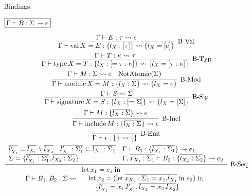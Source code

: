 Bindings:

$\fbox{$\Gamma \vdash B: \Sigma \rightsquigarrow e$}$

\begin{gather*}
  \infer[\text{B-Val}]{\Gamma \vdash \symval X = E: \{l_X: [\tau]\} \elaborate \{l_X = [e]\}}{
    \Gamma \vdash E: \tau \elaborate e
  }
  \\
  \infer[\text{B-Typ}]{\Gamma \vdash \symtype X = T: \{l_X: [= \tau: \kappa]\} \elaborate \{l_X = [\tau: \kappa]\}}{
    \Gamma \vdash T: \kappa \elaborate \tau
  }
  \\
  \infer[\text{B-Mod}]{\Gamma \vdash \symmodule X = M: \{l_X: \Sigma\} \elaborate \{l_X = e\}}{
    \Gamma \vdash M: \Sigma \elaborate e
    &
    \symNotAtomic(\Sigma)
  }
  \\
  \infer[\text{B-Sig}]{\Gamma \vdash \symsignature X = S: \{l_X: [= \Sigma]\} \elaborate \{l_X = [\Sigma]\}}{
    \Gamma \vdash S \elaborate \Sigma
  }
  \\
  \infer[\text{B-Incl}]{\Gamma \vdash \syminclude M: \{\overline{l_X: \Sigma}\} \elaborate e}{
    \Gamma \vdash M: \{\overline{l_X: \Sigma}\} \elaborate e
  }
  \\
  \infer[\text{B-Emt}]{\Gamma \vdash \epsilon: \{\} \elaborate \{\}}{}
  \\
  \infer[\text{B-Seq}]{
    \Gamma \vdash B_1; B_2: \Sigma \elaborate
    \begin{array}{l}
      \symlet x_1 = e_1 \symin \\
      \hspace{1em}\symlet x_2 = (\symlet \overline{x_{X_1}: \Sigma_1 = x_1.l_{X_1}} \symin e_2) \symin \\
      \hspace{2em}\{\overline{l'_{X_1} = x_1.l'_{X_1}}, \overline{l_{X_2} = x_2.l_{X_2}}\}
    \end{array}
  }{
    \begin{array}{lll}
      \overline{l'_{X_1}} = \overline{l_{X_1}} \rcomplement \overline{l_{X_2}}
      &
      \overline{l'_{X_1}: \Sigma'_1} \subseteq \overline{l_{X_1}: \Sigma_1}
      &
      \Gamma \vdash B_1: \{\overline{l_{X_1}: \Sigma_1}\} \elaborate e_1
      \\
      \multicolumn{2}{l}{\Sigma = \{\overline{l'_{X_1}: \Sigma'_1}, \overline{l_{X_2}: \Sigma_2}\}}
      &
      \Gamma, \overline{x_{X_1}: \Sigma_1} \vdash B_2: \{\overline{l_{X_2}: \Sigma_2}\} \elaborate e_2
    \end{array}
  }
\end{gather*}

